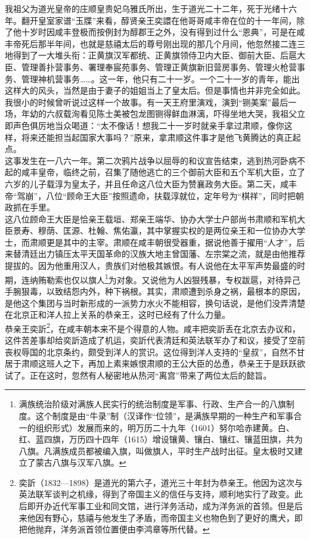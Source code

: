   我祖父为道光皇帝的庄顺皇贵妃乌雅氏所出，生于道光二十二年，死于光绪十六年。翻开皇室家谱“玉牒”来看，醇贤亲王奕譞在他哥哥咸丰帝在位的十一年间，除了他十岁时因咸丰登极而按例封为醇郡王之外，没有得到过什么“恩典”，可是在咸丰帝死后那半年间，也就是慈禧太后的尊号刚出现的那几个月间，他忽然接二连三地得到了一大堆头衔：正黄旗汉军都统、正黄旗领侍卫内大臣、御前大臣、后扈大臣、管理善扑营事务、署理奉宸苑事务、管理正黄旗新旧营房事务、管理火枪营事务、管理神机营事务……。这一年，他只有二十一岁。一个二十一岁的青年，能出这样大的风头，当然是由于妻子的姐姐当上了皇太后。但是事情也并非完全如此。我很小的时候曾听说过这样一个故事。有一天王府里演戏，演到“铡美案”最后一场，年幼的六叔载洵看见陈士美被包龙图铡得鲜血淋漓，吓得坐地大哭，我祖父立即声色俱厉地当众喝道：“太不像话！想我二十一岁时就亲手拿过肃顺，像你这样，将来还能担当起国家大事吗？”原来，拿肃顺这件事才是他飞黄腾达的真正起点。\\

  这事发生在一八六一年。第二次鸦片战争以屈辱的和议宣告结束，逃到热河卧病不起的咸丰皇帝，临终之前，召集了随他逃亡的三个御前大臣和五个军机大臣，立了六岁的儿子载淳为皇太子，并且任命这八位大臣为赞襄政务大臣。第二天，咸丰帝“驾崩”，八位“顾命王大臣”按照遗命，扶载淳就位，定年号为“棋祥”，同时把朝政抓在手里。\\

  这八位顾命王大臣是恰亲王载垣、郑亲王端华、协办大学士户部尚书肃顺和军机大臣景寿、穆荫、匡源、杜翰、焦佑瀛，其中掌握实权的是两位亲王和一位协办大学士，而肃顺更是其中的主宰。肃顺在咸丰朝很受器重，据说他善于擢用“人才”，后来替清廷出力镇压太平天国革命的汉族大地主曾国藩、左宗棠之流，就是由他推荐提拔的。因为他重用汉人，贵族们对他极其嫉恨。有人说他在太平军声势最盛的时期，连纳贿勒索也仅以旗人\footnote{满族统治阶级对满族人民实行的统治制度是军事、行政、生产合一的八旗制度。这个制度是由“牛录”制（汉译作“位领”，是满族早期的一种生产和军事合一的组织形式）发展而来的，明万历二十九年（1601）努尔哈赤建黄。白、红、蓝四旗，万历四十四年（1615）增设镶黄、镶白、镶红、镶蓝田旗，共为八旗。凡满族成员都被编入旗，叫做旗人，平时生产战时出征。皇太极时又建立了蒙古八旗与汉军八旗。}为对象。又说他为人凶狠残暴，专权跋扈，对待异己手腕狠毒，以致结怨内外，种下祸根。其实，肃顺遭到杀身之祸，最根本的原因，是他这个集团与当时新形成的一派势力水火不能相容，换句话说，是他们没弄清楚在北京正和洋人拉上关系的恭亲王，这时已经有了什么力量。\\

  恭亲王奕訢\footnote{奕訢（1832—1898）是道光的第六子，道光三十年封为恭亲王。他因为这次与英法联军谈判之机缘，得到了帝国主义的信任与支持，顺利地实行了政变。此后即开办近代军事工业和同文馆，进行洋务活动，成为洋务派的首领。但是后来他因有野心，慈禧与他发生了矛盾，而帝国主义也物色到了更好的鹰犬，即把他抛弃，洋务派首领位置便由李鸿章等所代替。}，在咸丰朝本来不是个得意的人物。咸丰把奕訢丢在北京去办议和，这件苦差事却给奕訢造成了机运，奕訢代表清廷和英法联军办了和议，接受了空前丧权辱国的北京条约，颇受到洋人的赏识。这位得到洋人支持的“皇叔”，自然不甘居于肃顺这班人之下，再加上素来嫉恨肃顺的王公大臣的怂恿，恭亲王于是跃跃欲试了。正在这时，忽然有人秘密地从热河“离宫”带来了两位太后的懿旨。\\


